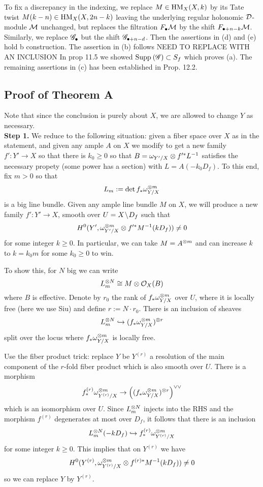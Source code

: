 \documentclass[12pt]{article}
\begin{document}
To fix a discrepancy in the indexing, we replace $M \in \mathrm{HM}_X(X, k)$ by its Tate twist $M(k-n) \in \mathrm{HM}_X(X, 2n-k)$ leaving the underlying regular holonomic $\mathcal{D}$-module $\mathcal{M}$ unchanged, but replaces the filtration $F_\bullet \mathcal{M}$ by the shift $F_{\bullet + n - k} \mathcal{M}$. Similarly, we replace $\mathscr{G}_\bullet$ but the shift $\mathscr{G}_{\bullet + n - d}$. Then the assertions in (d) and (e) hold b construction. The assertion in (b) follows {\color{red} NEED TO REPLACE WITH AN INCLUSION} In prop 11.5 we showed $\mathrm{Supp}_{}\left(\mathscr{G} \right) \subset S_f$ which proves (a). The remaining assertions in (c) has been established in Prop. 12.2. 


\subsection{Proof of Theorem A}

Note that since the conclusion is purely about $X$, we are allowed to change $Y$ as necessary.
\bigskip\\
\textbf{Step 1.} We reduce to the following situation: given a fiber space over $X$ as in the statement, and given any ample $A$ on $X$ we modify to get a new family $f' : Y' \to X$ so that there is $k_0 \ge 0$ so that $B = \omega_{Y' / X} \otimes f'^* L^{-1}$ satisfies the necessary propety (some power has a section) with $L = A(-k_0 D_f)$. To this end, fix $m > 0$ so that 
\[ L_m := \det{f_* \omega_{Y/X}^{\otimes m}} \]
is a big line bundle. Given any ample line bundle $M$ on $X$, we will produce a new family $f' : Y' \to X$, smooth over $U = X \! \setminus \! D_f$ such that
\[ H^0(Y', \omega_{Y'/X}^{\otimes m} \otimes f'^* M^{-1}(k D_f)) \neq 0 \]
for some integer $k \ge 0$. In particular, we can take $M = A^{\otimes m}$ and can increase $k$ to $k = k_0 m$ for some $k_0 \ge 0$ to win.
\par 
To show this, for $N$ big we can write
\[ L_m^{\otimes N} \cong M \otimes \mathcal{O}_{X}(B) \]
where $B$ is effective. Denote by $r_0$ the rank of $f_* \omega_{Y/X}^{\otimes m}$ over $U$, where it is locally free (here we use Siu) and define $r := N \cdot r_0$. There is an inclusion of sheaves
\[ L_m^{\otimes N} \hookrightarrow (f_* \omega_{Y/X}^{\otimes m})^{\otimes r} \]
split over the locus where $f_* \omega_{Y/X}^{\otimes m}$ is locally free. 
\par 
Use the fiber product trick: replace $Y$ be $Y^{(r)}$ a resolution of the main component of the $r$-fold fiber product which is also smooth over $U$. There is a morphism
\[ f_*^{(r)} \omega_{Y^{(r)}/X}^{\otimes m} \to \left( (f_* \omega_{Y/X}^{\otimes m})^{\otimes r} \right)^{\vee \vee} \]
which is an isomorphism over $U$. Since $L_m^{\otimes N}$ injects into the RHS and the morphism $f^{(r)}$ degenerates at most over $D_f$, it follows that there is an inclusion
\[ L_m^{\otimes N}(-k D_f) \hookrightarrow f_*^{(r)} \omega_{Y^{(r)} / X}^{\otimes m} \]
for some integer $k \ge 0$. This implies that on $Y^{(r)}$ we have 
\[ H^0(Y^{(r)}, \omega_{Y^{(r)}/X}^{\otimes m} \otimes f^{(r)*} M^{-1}(k D_f)) \neq 0 \]
so we can replace $Y$ by $Y^{(r)}$.
\end{document}

